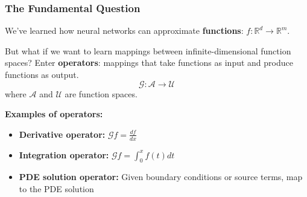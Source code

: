\documentclass[notes]{beamer}
\begin{document}
\begin{frame}
\frametitle{The Fundamental Question}

We've learned how neural networks can approximate \textbf{functions}: $f: \mathbb{R}^d \rightarrow \mathbb{R}^m$.

\vspace{1cm}

\begin{alertblock}{But what if we want to learn mappings between infinite-dimensional function spaces?}
Enter \textbf{operators}: mappings that take functions as input and produce functions as output.
\begin{equation*}
\mathcal{G}: \mathcal{A} \rightarrow \mathcal{U}
\end{equation*}
where $\mathcal{A}$ and $\mathcal{U}$ are function spaces.
\end{alertblock}

\textbf{Examples of operators:}
\begin{itemize}
    \item \textbf{Derivative operator:} $\mathcal{G}f = \frac{df}{dx}$
    \item \textbf{Integration operator:} $\mathcal{G}f = \int_0^x f(t) dt$
    \item \textbf{PDE solution operator:} Given boundary conditions or source terms, map to the PDE solution
\end{itemize}

\end{frame}
\end{document}
